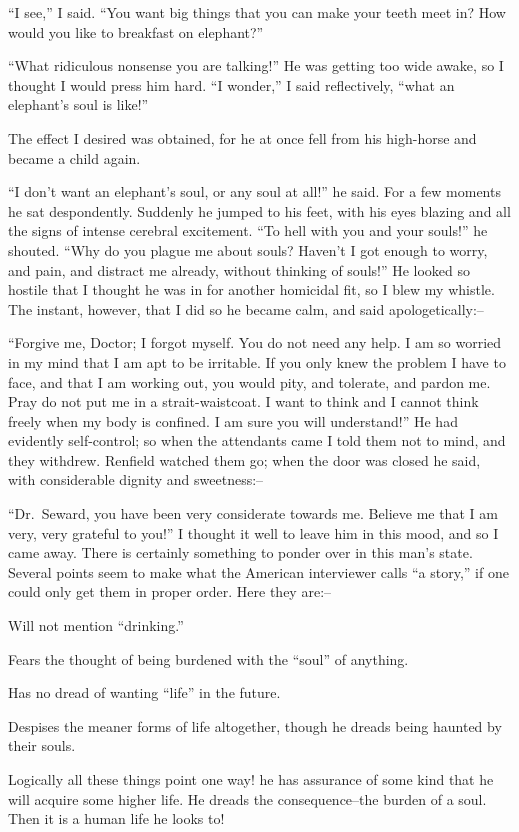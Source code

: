 \documentclass[12pt,openright]{book}
\begin{document}
“I see,” I said. “You want big things that you can make your teeth meet in? How would you like to breakfast on elephant?”

“What ridiculous nonsense you are talking!” He was getting too wide awake, so I thought I would press him hard. “I wonder,” I said reflectively, “what an elephant’s soul is like!”

The effect I desired was obtained, for he at once fell from his high-horse and became a child again.

“I don’t want an elephant’s soul, or any soul at all!” he said. For a few moments he sat despondently. Suddenly he jumped to his feet, with his eyes blazing and all the signs of intense cerebral excitement. “To hell with you and your souls!” he shouted. “Why do you plague me about souls? Haven’t I got enough to worry, and pain, and distract me already, without thinking of souls!” He looked so hostile that I thought he was in for another homicidal fit, so I blew my whistle. The instant, however, that I did so he became calm, and said apologetically:–

“Forgive me, Doctor; I forgot myself. You do not need any help. I am so worried in my mind that I am apt to be irritable. If you only knew the problem I have to face, and that I am working out, you would pity, and tolerate, and pardon me. Pray do not put me in a strait-waistcoat. I want to think and I cannot think freely when my body is confined. I am sure you will understand!” He had evidently self-control; so when the attendants came I told them not to mind, and they withdrew. Renfield watched them go; when the door was closed he said, with considerable dignity and sweetness:–

“Dr. Seward, you have been very considerate towards me. Believe me that I am very, very grateful to you!” I thought it well to leave him in this mood, and so I came away. There is certainly something to ponder over in this man’s state. Several points seem to make what the American interviewer calls “a story,” if one could only get them in proper order. Here they are:–

Will not mention “drinking.”

Fears the thought of being burdened with the “soul” of anything.

Has no dread of wanting “life” in the future.

Despises the meaner forms of life altogether, though he dreads being haunted by their souls.

Logically all these things point one way! he has assurance of some kind that he will acquire some higher life. He dreads the consequence–the burden of a soul. Then it is a human life he looks to!
\end{document}
